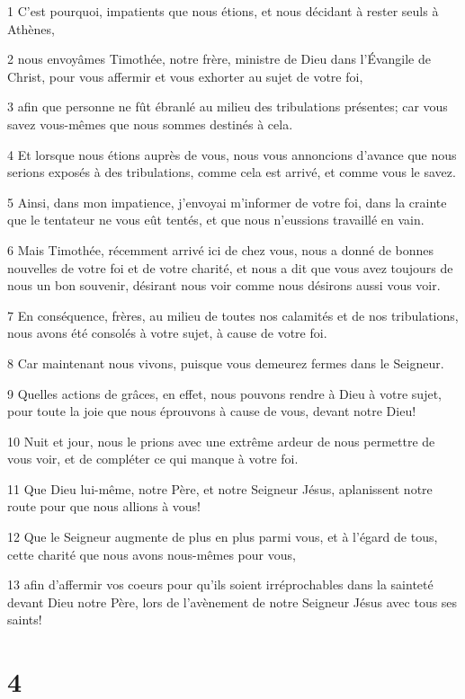 \par 1 C'est pourquoi, impatients que nous étions, et nous décidant à rester seuls à Athènes,
\par 2 nous envoyâmes Timothée, notre frère, ministre de Dieu dans l'Évangile de Christ, pour vous affermir et vous exhorter au sujet de votre foi,
\par 3 afin que personne ne fût ébranlé au milieu des tribulations présentes; car vous savez vous-mêmes que nous sommes destinés à cela.
\par 4 Et lorsque nous étions auprès de vous, nous vous annoncions d'avance que nous serions exposés à des tribulations, comme cela est arrivé, et comme vous le savez.
\par 5 Ainsi, dans mon impatience, j'envoyai m'informer de votre foi, dans la crainte que le tentateur ne vous eût tentés, et que nous n'eussions travaillé en vain.
\par 6 Mais Timothée, récemment arrivé ici de chez vous, nous a donné de bonnes nouvelles de votre foi et de votre charité, et nous a dit que vous avez toujours de nous un bon souvenir, désirant nous voir comme nous désirons aussi vous voir.
\par 7 En conséquence, frères, au milieu de toutes nos calamités et de nos tribulations, nous avons été consolés à votre sujet, à cause de votre foi.
\par 8 Car maintenant nous vivons, puisque vous demeurez fermes dans le Seigneur.
\par 9 Quelles actions de grâces, en effet, nous pouvons rendre à Dieu à votre sujet, pour toute la joie que nous éprouvons à cause de vous, devant notre Dieu!
\par 10 Nuit et jour, nous le prions avec une extrême ardeur de nous permettre de vous voir, et de compléter ce qui manque à votre foi.
\par 11 Que Dieu lui-même, notre Père, et notre Seigneur Jésus, aplanissent notre route pour que nous allions à vous!
\par 12 Que le Seigneur augmente de plus en plus parmi vous, et à l'égard de tous, cette charité que nous avons nous-mêmes pour vous,
\par 13 afin d'affermir vos coeurs pour qu'ils soient irréprochables dans la sainteté devant Dieu notre Père, lors de l'avènement de notre Seigneur Jésus avec tous ses saints!

\chapter{4}

